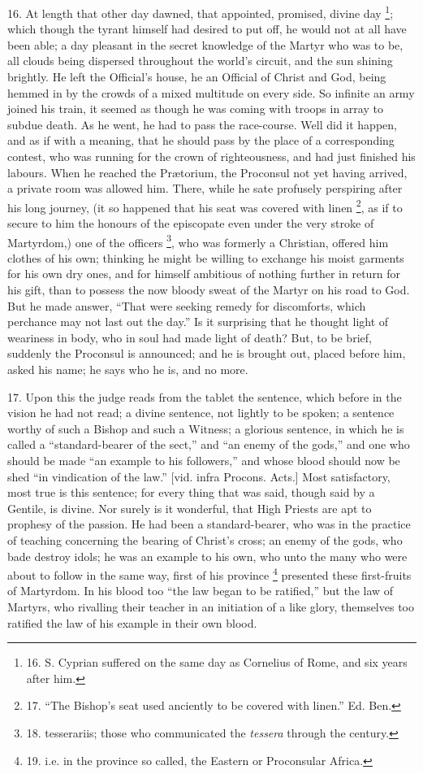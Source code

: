 16. At length that other day
dawned, that appointed, promised, divine day \footnote{16. S.
Cyprian suffered on the same day as Cornelius of Rome, and six years
after him.}; which though the tyrant himself had desired to put off, he
would not at all have been able; a day pleasant in the secret
knowledge of the Martyr who was to be, all clouds being
dispersed throughout the world's circuit, and the sun shining
brightly. He left the Official's house, he an Official of Christ and
God, being hemmed in by the crowds of a mixed multitude on every side.
So infinite an army joined his train, it seemed as though he was
coming with troops in array to subdue death. As he went, he had to
pass the race-course. Well did it happen, and as if with a meaning,
that he should pass by the place of a corresponding contest, who was
running for the crown of righteousness, and had just finished his
labours. When he reached the Prætorium, the Proconsul not yet having
arrived, a private room was allowed him. There, while he sate
profusely perspiring after his long journey, (it so happened that his
seat was covered with linen \footnote{17. ``The
Bishop's seat used anciently to be covered with linen.'' Ed. Ben.},
as if to secure to him the honours of the episcopate even under the
very stroke of Martyrdom,) one of the officers \footnote{18.
tesserariis; those who communicated the \emph{tessera} through the
century.}, who was formerly a Christian, offered him clothes of his own;
thinking he might be willing to exchange his moist garments for his
own dry ones, and for himself ambitious of nothing further in return
for his gift, than to possess the now bloody sweat of the Martyr on
his road to God. But he made answer, ``That were seeking remedy for
discomforts, which perchance may not last out the day.'' Is it
surprising that he thought light of weariness in body, who in soul had
made light of death? But, to be brief, suddenly the Proconsul is
announced; and he is brought out, placed before him, asked his name;
he says who he is, and no more.

17. Upon this the judge reads
from the tablet the sentence, which before in the vision he had not
read; a divine sentence, not lightly to be spoken; a sentence worthy
of such a Bishop and such a Witness; a glorious sentence, in which he
is called a ``standard-bearer of the sect,'' and ``an enemy of the gods,''
and one who should be made ``an example to his followers,'' and whose
blood should now be shed ``in vindication of the law.'' [vid. infra
Procons. Acts.] Most satisfactory, most true is this sentence; for
every thing that was said, though said by a Gentile, is divine. Nor
surely is it wonderful, that High Priests are apt to prophesy of the
passion. He had been a standard-bearer, who was in the
practice of teaching concerning the bearing of Christ's cross; an
enemy of the gods, who bade destroy idols; he was an example to his
own, who unto the many who were about to follow in the same way, first
of his province \footnote{19. i.e.
in the province so called, the Eastern or Proconsular Africa.}
presented these first-fruits of Martyrdom. In his blood too ``the law
began to be ratified,'' but the law of Martyrs, who rivalling their
teacher in an initiation of a like glory, themselves too ratified the
law of his example in their own blood.

